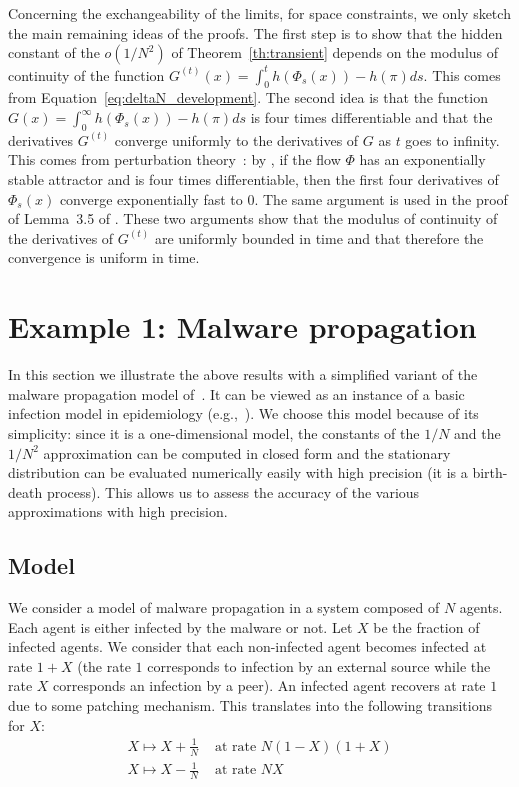 \documentclass[sigconf]{acmart}
\begin{document}
Concerning the exchangeability of the limits, for space constraints,
we only sketch the main remaining ideas of the proofs.
The first step is to show that the hidden constant of the $o(1/N^2)$
of Theorem~\ref{th:transient} depends on the modulus of continuity of
the function $G^{(t)}(x)=\int_0^t h(\Phi_s(x))-h(\pi)ds$. This comes
from Equation~\eqref{eq:deltaN_development}.  The second idea is that
the function $G(x)=\int_0^\infty h(\Phi_s(x))-h(\pi)ds$ is four times
differentiable and that the derivatives $G^{(t)}$ converge uniformly
to the derivatives of $G$ as $t$ goes to infinity. This comes from
perturbation theory~: by \cite[Lemma~C.1]{eldering2013normally}, if
the flow $\Phi$ has an exponentially stable attractor and is four
times differentiable, then the first four derivatives of $\Phi_s(x)$
converge exponentially fast to $0$. The same argument is used in the
proof of Lemma~3.5 of \cite{gast2017refined}. These two arguments show
that the modulus of continuity of the derivatives of $G^{(t)}$ are
uniformly bounded in time and that therefore the convergence is
uniform in time. 
 


\section{Example 1: Malware propagation}
\label{sec:SIS}

In this section we illustrate the above results with a simplified variant of the malware
propagation model of~\cite{benaim2008class,khouzani2012maximum}. It can be viewed as an 
instance of a basic infection model in epidemiology (e.g.,~\cite{murray:i}). We choose this
model because of its simplicity: since it is a one-dimensional model,
the constants of the $1/N$ and the $1/N^2$ approximation can be
computed in closed form and the stationary distribution can be
evaluated numerically easily with high precision (it is a birth-death
process). This allows us to assess the accuracy of
the various approximations with high precision.

\subsection{Model}

We consider a model of malware propagation in a system composed of $N$
agents. Each agent is either infected by the malware or
not. Let $X$ be the fraction of infected agents.  We consider that
each non-infected agent becomes infected at rate $1+X$ (the rate
$1$ corresponds to infection by an external source while the rate $X$
corresponds an infection by a peer). An infected agent recovers at
rate $1$ due to some patching mechanism. This translates into the
following transitions for $X$:
\begin{align*}
  X \mapsto X+\frac1N & \text{ at rate $N(1-X)(1+X)$}\\
  X \mapsto X-\frac1N & \text{ at rate $NX$}
\end{align*}
\end{document}
